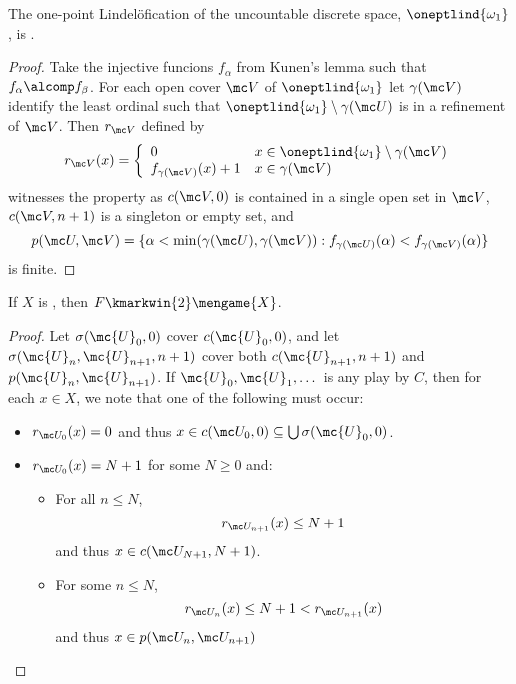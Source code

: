   \begin{thm}
    The one-point Lindel\"ofication of the uncountable discrete space, $\oneptlind{\omega_1}$, is \scish.
  \end{thm}

  \begin{proof}
    Take the injective funcions $f_\alpha$ from Kunen's lemma such that $f_\alpha \alcomp f_\beta$. For each open cover $\mc V$ of $\oneptlind{\omega_1}$ let $\gamma(\mc V)$ identify the least ordinal such that $\oneptlind{\omega_1}\setminus\gamma(\mc U)$ is in a refinement of $\mc V$. Then $r_{\mc V}$ defined by
      \[
        r_{\mc V}(x) = \left\{
      \begin{array}{ll}
        0 & x\in\oneptlind{\omega_1}\setminus\gamma(\mc V) \\
        f_{\gamma(\mc V)}(x)+1 & x\in\gamma(\mc V)
      \end{array}
      \right.
      \] 
    witnesses the property as $c(\mc V,0)$ is contained in a single open set in $\mc V$, $c(\mc V,n+1)$ is a singleton or empty set, and
      \[
        p(\mc U,\mc V) = \{\alpha<\min(\gamma(\mc U),\gamma(\mc V)) : f_{\gamma(\mc U)}(\alpha)<f_{\gamma(\mc V)}(\alpha)\}
      \]
    is finite.
  \end{proof}

  \begin{thm}
    If $X$ is \scish, then $F \kmarkwin{2}\mengame{X}$.
  \end{thm}

  \begin{proof}
    Let $\sigma(\mc{U}_0,0)$ cover $c(\mc{U}_0,0)$, and let $\sigma(\mc{U}_n,\mc{U}_{n+1},n+1)$ cover both $c(\mc{U}_{n+1},n+1)$ and $p(\mc{U}_n,\mc{U}_{n+1})$. If $\mc{U}_0,\mc{U}_1,\dots$ is any play by $C$, then for each $x\in X$, we note that one of the following must occur:
      \begin{itemize}
        \item $r_{\mc U_0}(x)=0$ and thus $x\in c(\mc U_0,0)\subseteq \bigcup \sigma(\mc{U}_0,0)$.
        \item $r_{\mc U_0}(x)=N+1$ for some $N\geq 0$ and:
        \begin{itemize}
          \item For all $n\leq N$, 
            \[
              r_{\mc U_{n+1}}(x)\leq N+1
            \] 
            and thus $x\in c(\mc U_{N+1},N+1)$.
          \item For some $n \leq N$, 
            \[
              r_{\mc U_n}(x)\leq N+1 < r_{\mc U_{n+1}}(x)
            \]
           and thus $x\in p(\mc U_n,\mc U_{n+1})$
         \end{itemize}
      \end{itemize}
  \end{proof}

